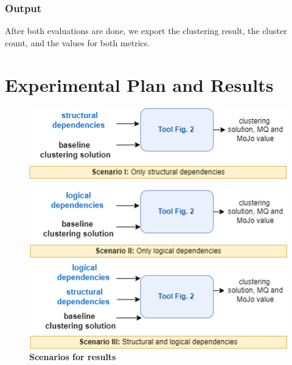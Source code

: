 \documentclass{ieeeaccess}
\begin{document}
\subsubsection{Output}

After both evaluations are done, we export the clustering result, the cluster count, and the values for both metrics.

\section{Experimental Plan and Results}
\label{sec:experiment}

\begin{figure}[t!]
  \centering
  \includegraphics[width=\columnwidth]{scenario.png}
  \caption{ \textbf{Scenarios for results}}
  \label{fig:scenatrio}
\end{figure}
\end{document}
